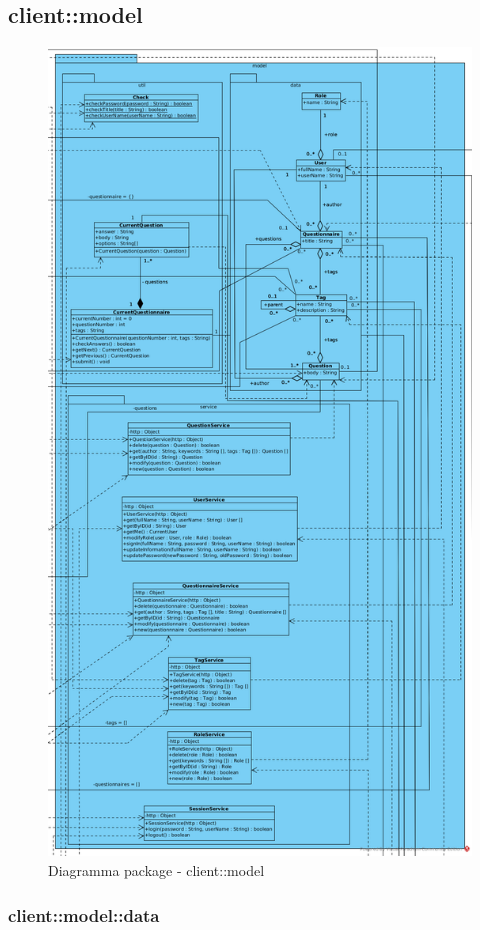 \subsection{client::model}
\begin{center}
		\begin{figure}[H]
			\centering \includegraphics[scale=4, max width=\textwidth, max height=\myheight]{../img/diagrammiClassi/client/model.png}
			\caption{Diagramma package - client::model}
		\end{figure}
	\end{center}\subsubsection{client::model::data}
